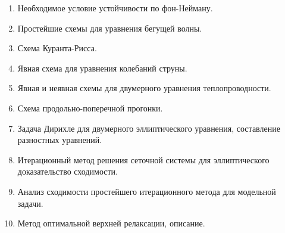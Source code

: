 \documentclass{trnotes}
\begin{document}
\begin{enumerate}
\item Необходимое условие устойчивости по фон-Нейману.
\item Простейшие схемы для уравнения бегущей волны.
\item Схема Куранта-Рисса.
\item Явная схема для уравнения колебаний струны.
\item Явная и неявная схемы для двумерного уравнения теплопроводности.
\item Схема продольно-поперечной прогонки.
\item Задача Дирихле для двумерного эллиптического уравнения, составление разностных уравнений.
\item Итерационный метод  решения сеточной системы для эллиптического
доказательство сходимости.
\item Анализ сходимости простейшего итерационного метода для модельной задачи.
\item Метод оптимальной верхней релаксации, описание.
\end{enumerate}
\end{document}
